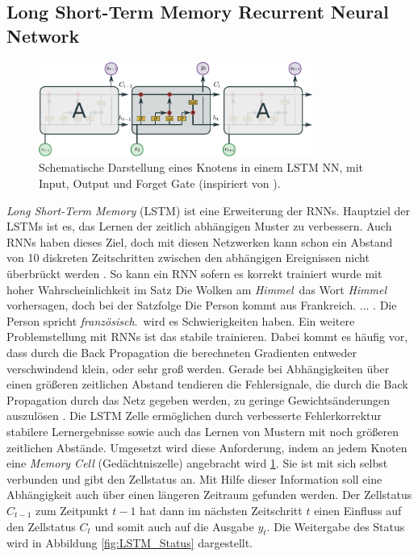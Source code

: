     \subsection{Long Short-Term Memory Recurrent Neural Network}
    
    
    	\begin{figure}[ht]
    		\centering
    		\includegraphics[width=0.8\textwidth]{images/Illustrationen/LSTM}
    		\caption{Schematische Darstellung eines Knotens in einem LSTM NN, mit Input, Output und Forget Gate (inspiriert von \cite{OLAH2015}).}
    		\label{fig:LSTM}
    	\end{figure}
   	
        \textit{Long Short-Term Memory} (LSTM) ist eine Erweiterung der RNNs.
        Hauptziel der LSTMs ist es, das Lernen der zeitlich abhängigen Muster zu verbessern.
        Auch RNNs haben dieses Ziel, doch mit diesen Netzwerken kann schon ein Abstand von 10 diskreten Zeitschritten zwischen den abhängigen Ereignissen nicht überbrückt werden \cite{HOCHREITER1991}. 
        So kann ein RNN sofern es korrekt trainiert wurde mit hoher Wahrscheinlichkeit im Satz \glqq Die Wolken am \textit{Himmel}\grqq \ das Wort \textit{Himmel} vorhersagen, doch bei der Satzfolge \glqq Die Person kommt aus Frankreich. ... . Die Person spricht \textit{französisch}.\grqq \ wird es Schwierigkeiten haben.
        Ein weitere Problemstellung mit RNNs ist das stabile trainieren.
        Dabei kommt es häufig vor, dass durch die Back Propagation die berechneten Gradienten entweder verschwindend klein, oder sehr groß werden.
        Gerade bei Abhängigkeiten über einen größeren zeitlichen Abstand tendieren die Fehlersignale, die durch die Back Propagation durch das Netz gegeben werden, zu geringe Gewichtsänderungen auszulösen \cite{HOCHREITER1998}.
        Die LSTM Zelle ermöglichen durch verbesserte Fehlerkorrektur stabilere Lernergebnisse sowie auch das Lernen von Mustern mit noch größeren zeitlichen Abstände.
        Umgesetzt wird diese Anforderung, indem an jedem Knoten eine \textit{Memory Cell} (Gedächtniszelle) angebracht wird \ref{fig:LSTM}.
        Sie ist mit sich selbst verbunden und gibt den Zellstatus an.
        Mit Hilfe dieser Information soll eine Abhängigkeit auch über einen längeren Zeitraum gefunden werden.
        Der Zellstatus $C_{t-1}$ zum Zeitpunkt $t-1$ hat dann im nächsten Zeitschritt $t$ einen Einfluss auf den Zellstatus $C_{t}$ und somit auch auf die Ausgabe $y_t$.
        Die Weitergabe des Status wird in Abbildung \ref{fig:LSTM_Status} dargestellt.

